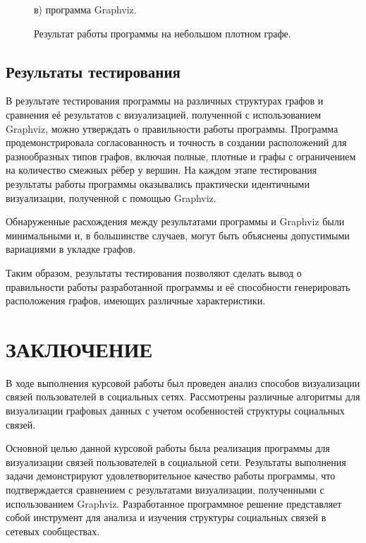 \documentclass[14pt, russian]{scrartcl}
\newcommand{\anonsection}[1]{\cleardoublepage
\phantomsection
\addcontentsline{toc}{section}{\protect\numberline{}#1}
\section*{#1}\vspace*{2.5ex} %
}
\begin{document}
\begin{figure}[H]
\begin{minipage}[t]{.55\textwidth}
  \caption*{в) программа Graphviz.}
  \end{minipage}
\caption{Результат работы программы на небольшом плотном графе.}
\label{fig:quad_tree_res}
\end{figure}


\subsection{Результаты тестирования}

В результате тестирования программы на различных структурах графов и сравнения её результатов с визуализацией, полученной с использованием Graphviz, можно утверждать о правильности работы программы. Программа продемонстрировала согласованность и точность в создании расположений для разнообразных типов графов, включая полные, плотные и графы с ограничением на количество смежных рёбер у вершин. На каждом этапе тестирования результаты работы программы оказывались практически идентичными визуализации, полученной с помощью Graphviz. 

Обнаруженные расхождения между результатами программы и Graphviz были минимальными и, в большинстве случаев, могут быть объяснены допустимыми вариациями в укладке графов.

Таким образом, результаты тестирования позволяют сделать вывод о правильности работы разработанной программы и её способности генерировать расположения графов, имеющих различные характеристики.


\newpage
\anonsection{ЗАКЛЮЧЕНИЕ}  %


В ходе выполнения курсовой работы был проведен анализ способов визуализации связей пользователей в социальных сетях. Рассмотрены различные алгоритмы для визуализации графовых данных с учетом особенностей структуры социальных связей.

Основной целью данной курсовой работы была реализация программы для визуализации связей пользователей в социальной сети. Результаты выполнения задачи демонстрируют удовлетворительное качество работы программы, что подтверждается сравнением с результатами визуализации, полученными с использованием Graphviz. Разработанное программное решение представляет собой инструмент для анализа и изучения структуры социальных связей в сетевых сообществах.
\end{document}
